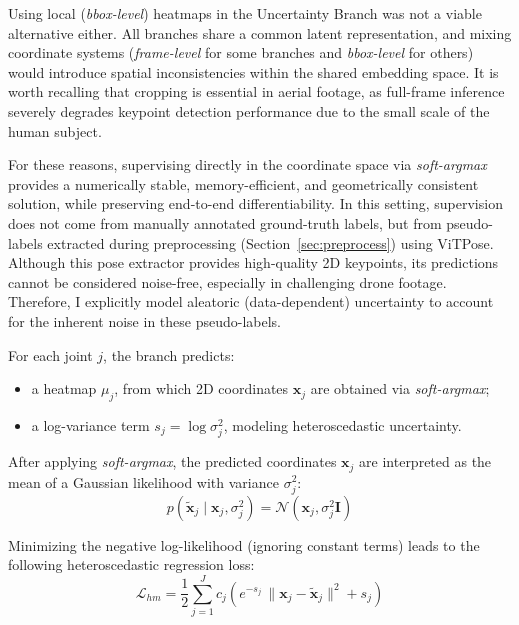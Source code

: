 Using local (\textit{bbox-level}) heatmaps in the Uncertainty Branch was not a viable alternative either. All branches share a common latent representation, and mixing coordinate systems (\textit{frame-level} for some branches and 
\textit{bbox-level} for others) would introduce spatial inconsistencies within the shared embedding space. It is worth recalling that cropping is essential in aerial footage, as full-frame inference severely degrades keypoint detection 
performance due to the small scale of the human subject.

For these reasons, supervising directly in the coordinate space via \textit{soft-argmax} provides a numerically stable, memory-efficient, and geometrically consistent solution, while preserving end-to-end differentiability.
In this setting, supervision does not come from manually annotated ground-truth labels, but from pseudo-labels extracted during preprocessing (Section~\ref{sec:preprocess}) using ViTPose. Although this pose extractor provides 
high-quality 2D keypoints, its predictions cannot be considered noise-free, especially in challenging drone footage. Therefore, I explicitly model aleatoric (data-dependent) uncertainty to account for the inherent noise in these 
pseudo-labels.

For each joint $j$, the branch predicts:
\begin{itemize}
    \item a heatmap $\mu_j$, from which 2D coordinates $\mathbf{x}_j$ are obtained via \textit{soft-argmax};
    \item a log-variance term $s_j = \log \sigma_j^2$, modeling heteroscedastic uncertainty.
\end{itemize}

After applying \textit{soft-argmax}, the predicted coordinates $\mathbf{x}_j$ are interpreted as the mean of a Gaussian likelihood with variance $\sigma_j^2$:
\begin{equation}
    p(\tilde{\mathbf{x}}_j \mid \mathbf{x}_j, \sigma_j^2) = \mathcal{N}(\mathbf{x}_j, \sigma_j^2 \mathbf{I})
\end{equation}

Minimizing the negative log-likelihood (ignoring constant terms) leads to the following heteroscedastic regression loss:
\begin{equation}
    \mathcal{L}_{hm} =
    \frac{1}{2} \sum_{j=1}^{J}
    c_j
    \left(
    e^{-s_j}\,
    \| \mathbf{x}_j - \tilde{\mathbf{x}}_j \|^2
    + s_j
    \right)
\end{equation}

